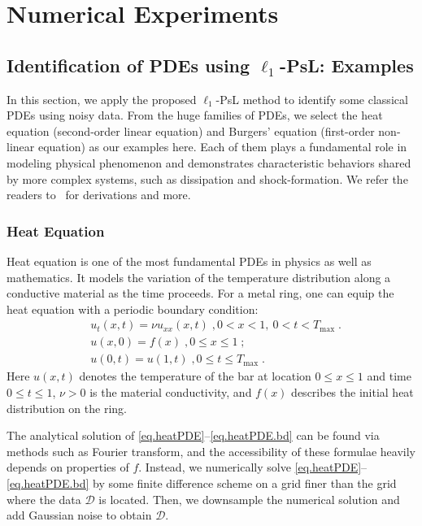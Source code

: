 \documentclass[a4paper,11pt]{article}
\begin{document}
\section{Numerical Experiments}\label{sec.numerical}

\subsection{Identification of PDEs using $\ell_1$-PsL: Examples}
In this section, we apply the proposed $\ell_1$-PsL method to identify some classical PDEs using noisy data. From the huge families of PDEs, we select the heat equation (second-order linear equation) and Burgers' equation (first-order non-linear equation) as our examples here. Each of them plays a fundamental role in modeling physical phenomenon and demonstrates characteristic behaviors shared by more complex systems, such as dissipation and shock-formation. We refer the readers to~\cite{haberman1983elementary} for derivations and more. 
\subsubsection{Heat Equation}
Heat equation is one of the most fundamental PDEs in physics as well as mathematics. It models the variation of the temperature distribution along a conductive material as the time proceeds. For a metal ring, one can equip the heat equation with a periodic boundary condition:
\begin{align}
&u_t(x,t) = \nu u_{xx}(x,t)\;,0<x<1,~0<t<T_{\max}\;.\label{eq.heatPDE}\\
&u(x,0)=f(x)\;, 0\leq x\leq 1\;;\label{eq.heatPDE.ival}\\
&u(0,t)=u(1,t)\;,0\leq t\leq T_{\max}\label{eq.heatPDE.bd}\;.
\end{align}
Here $u(x,t)$ denotes the temperature of the bar at location $0\leq x\leq 1 $ and time $0\leq t\leq 1$, $\nu>0$ is the material conductivity, and $f(x)$ describes the initial heat distribution on the ring. 

The analytical solution of \eqref{eq.heatPDE}--\eqref{eq.heatPDE.bd} can be found via methods such as Fourier transform, and the accessibility of these formulae heavily depends on properties of $f$. Instead, we numerically solve \eqref{eq.heatPDE}--\eqref{eq.heatPDE.bd} by some finite difference scheme on a grid finer than the grid where the data $\mathcal{D}$ is located. Then, we downsample the numerical solution and add Gaussian noise to obtain $\mathcal{D}$. 
\end{document}
